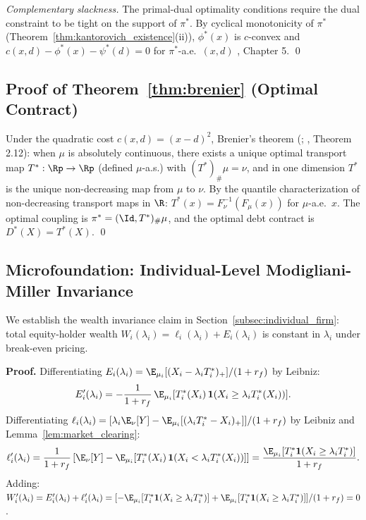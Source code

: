 \emph{Complementary slackness.} The primal-dual optimality conditions require the dual constraint to be tight on the support of $\pi^*$. By cyclical monotonicity of $\pi^*$ (Theorem~\ref{thm:kantorovich_existence}(ii)), $\phi^*(x)$ is $c$-convex and $c(x,d) - \phi^*(x) - \psi^*(d) = 0$ for $\pi^*$-a.e.\ $(x,d)$ \citep{villani2009optimal}, Chapter 5. \qed

\subsection*{Proof of Theorem~\ref{thm:brenier} (Optimal Contract)}

Under the quadratic cost $c(x,d)=(x-d)^2$, Brenier's theorem (\citealt{brenier1991polar}; \citealt{villani2009optimal}, Theorem 2.12): when $\mu$ is absolutely continuous, there exists a unique optimal transport map $T^*:\Rp\to\Rp$ (defined $\mu$-a.s.) with $(T^*)_\#\mu=\nu$, and in one dimension $T^*$ is the unique non-decreasing map from $\mu$ to $\nu$. By the quantile characterization of non-decreasing transport maps in $\R$: $T^*(x) = F_\nu^{-1}(F_\mu(x))$ for $\mu$-a.e.\ $x$. The optimal coupling is $\pi^* = (\Id, T^*)_\#\mu$, and the optimal debt contract is $D^*(X) = T^*(X)$. \qed

\subsection*{Microfoundation: Individual-Level Modigliani-Miller Invariance}

We establish the wealth invariance claim in Section~\ref{subsec:individual_firm}: total equity-holder wealth $W_i(\lambda_i) = \ell_i(\lambda_i) + E_i(\lambda_i)$ is constant in $\lambda_i$ under break-even pricing.

\textbf{Proof.} Differentiating $E_i(\lambda_i) = \E_{\mu_i}[(X_i - \lambda_i T_i^*)_+]/(1+r_f)$ by Leibniz:
\[
  E_i'(\lambda_i) = -\frac{1}{1+r_f}\,\E_{\mu_i}[T_i^*(X_i)\,\mathbf{1}(X_i \geq \lambda_i T_i^*(X_i))].
\]
Differentiating $\ell_i(\lambda_i) = [\lambda_i \E_\nu[Y] - \E_{\mu_i}[(\lambda_i T_i^*-X_i)_+]]/(1+r_f)$ by Leibniz and Lemma~\ref{lem:market_clearing}:
\[
  \ell_i'(\lambda_i) = \frac{1}{1+r_f}\left[\E_\nu[Y] - \E_{\mu_i}[T_i^*(X_i)\,\mathbf{1}(X_i < \lambda_i T_i^*(X_i))]\right] = \frac{\E_{\mu_i}[T_i^*\mathbf{1}(X_i \geq \lambda_i T_i^*)]}{1+r_f}.
\]
Adding: $W_i'(\lambda_i) = E_i'(\lambda_i) + \ell_i'(\lambda_i) = [-\E_{\mu_i}[T_i^*\mathbf{1}(X_i \geq \lambda_i T_i^*)] + \E_{\mu_i}[T_i^*\mathbf{1}(X_i \geq \lambda_i T_i^*)]]/(1+r_f) = 0$.

